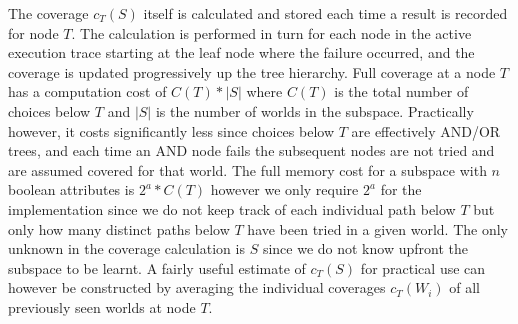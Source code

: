 The coverage $c_T(S)$ itself is calculated and stored each time a result is recorded for node $T$. The calculation is performed in turn for each node in the active execution trace starting at the leaf node where the failure occurred, and the coverage is updated progressively up the tree hierarchy. Full coverage at a node $T$ has a computation cost of $C(T)*|S|$ where $C(T)$ is the total number of choices below $T$ and $|S|$ is the number of worlds in the subspace. Practically however, it costs significantly less since choices below $T$ are effectively AND/OR trees, and each time an AND node fails the subsequent nodes are not tried and are assumed covered for that world. The full memory cost for a subspace with $n$ boolean attributes is $2^a*C(T)$ however we only require $2^a$ for the implementation since we do not keep track of each individual path below $T$ but only how many distinct paths below $T$ have been tried in a given world. The only unknown in the coverage calculation is $S$ since we do not know upfront the subspace to be learnt. A fairly useful estimate of $c_T(S)$ for practical use can however be constructed by averaging the individual coverages $c_T(W_i)$ of all previously seen worlds at node $T$. 

